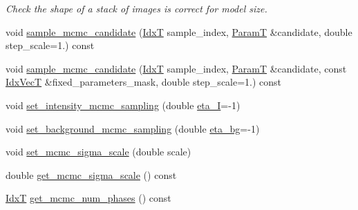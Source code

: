 \begin{DoxyCompactItemize}
\begin{DoxyCompactList}\small\item\em Check the shape of a stack of images is correct for model size. \end{DoxyCompactList}\item 
void \hyperlink{classmappel_1_1MCMCAdaptor1D_af99aecf740294e4945315a835ef5247a}{sample\+\_\+mcmc\+\_\+candidate} (\hyperlink{namespacemappel_ab17ec0f30b61ece292439d7ece81d3a8}{IdxT} sample\+\_\+index, \hyperlink{classmappel_1_1PointEmitterModel_a665ec6aea3aac139bb69a23c06d4b9a1}{ParamT} \&candidate, double step\+\_\+scale=1.) const 
\item 
void \hyperlink{classmappel_1_1MCMCAdaptor1D_af3e25b902a397fb5cbd2cbe32103d46f}{sample\+\_\+mcmc\+\_\+candidate} (\hyperlink{namespacemappel_ab17ec0f30b61ece292439d7ece81d3a8}{IdxT} sample\+\_\+index, \hyperlink{classmappel_1_1PointEmitterModel_a665ec6aea3aac139bb69a23c06d4b9a1}{ParamT} \&candidate, const \hyperlink{namespacemappel_ac63743dcd42180127307cd0e4ecdd784}{Idx\+VecT} \&fixed\+\_\+parameters\+\_\+mask, double step\+\_\+scale=1.) const 
\item 
void \hyperlink{classmappel_1_1MCMCAdaptor1D_ac70f768928859b1e9449b0ec1a141c4c}{set\+\_\+intensity\+\_\+mcmc\+\_\+sampling} (double \hyperlink{classmappel_1_1MCMCAdaptor1D_a5780d326be0c40e10d6c91777cfffbd3}{eta\+\_\+I}=-\/1)
\item 
void \hyperlink{classmappel_1_1MCMCAdaptor1D_ae79ee3845fbdd0e378f00eeebf8ccef1}{set\+\_\+background\+\_\+mcmc\+\_\+sampling} (double \hyperlink{classmappel_1_1MCMCAdaptor1D_af54c93421b8e298289cbb92743c6b3d5}{eta\+\_\+bg}=-\/1)
\item 
void \hyperlink{classmappel_1_1MCMCAdaptorBase_aa6b8eea136bf1f34f0c50bf8d1937a58}{set\+\_\+mcmc\+\_\+sigma\+\_\+scale} (double scale)
\item 
double \hyperlink{classmappel_1_1MCMCAdaptorBase_a9de5ee52bbf5c8fd3c1e3bd00836801a}{get\+\_\+mcmc\+\_\+sigma\+\_\+scale} () const 
\item 
\hyperlink{namespacemappel_ab17ec0f30b61ece292439d7ece81d3a8}{IdxT} \hyperlink{classmappel_1_1MCMCAdaptorBase_adb9997f1dc774f3a169c61cdb730a85f}{get\+\_\+mcmc\+\_\+num\+\_\+phases} () const 
\end{DoxyCompactItemize}
